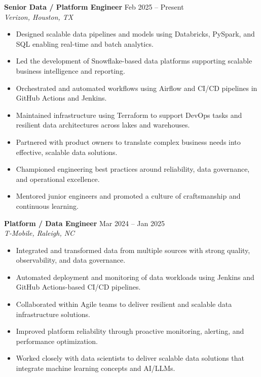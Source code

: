 \documentclass[10pt]{article}
\begin{document}
\textbf{Senior Data / Platform Engineer} \hfill Feb 2025 -- Present \\
\textit{Verizon, Houston, TX}
\begin{itemize}[leftmargin=*, itemsep=3pt]
    \item Designed scalable data pipelines and models using Databricks, PySpark, and SQL enabling real-time and batch analytics.
    \item Led the development of Snowflake-based data platforms supporting scalable business intelligence and reporting.
    \item Orchestrated and automated workflows using Airflow and CI/CD pipelines in GitHub Actions and Jenkins.
    \item Maintained infrastructure using Terraform to support DevOps tasks and resilient data architectures across lakes and warehouses.
    \item Partnered with product owners to translate complex business needs into effective, scalable data solutions.
    \item Championed engineering best practices around reliability, data governance, and operational excellence.
    \item Mentored junior engineers and promoted a culture of craftsmanship and continuous learning.
\end{itemize}

\textbf{Platform / Data Engineer} \hfill Mar 2024 -- Jan 2025 \\
\textit{T-Mobile, Raleigh, NC}
\begin{itemize}[leftmargin=*, itemsep=3pt]
    \item Integrated and transformed data from multiple sources with strong quality, observability, and data governance.
    \item Automated deployment and monitoring of data workloads using Jenkins and GitHub Actions-based CI/CD pipelines.
    \item Collaborated within Agile teams to deliver resilient and scalable data infrastructure solutions.
    \item Improved platform reliability through proactive monitoring, alerting, and performance optimization.
    \item Worked closely with data scientists to deliver scalable data solutions that integrate machine learning concepts and AI/LLMs.
\end{itemize}
\end{document}
